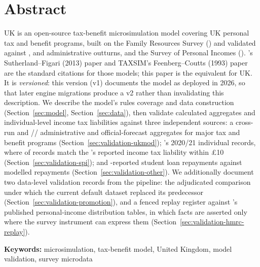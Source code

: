 \section*{Abstract}

\policyengine{} UK is an open-source tax-benefit microsimulation model
covering 
UK personal tax and benefit programs, built on the Family Resources Survey
(\frs{}) and validated against \ukmod{}, \hmrc{} and \dwp{} administrative
outturns, and the Survey of Personal Incomes (\spi{}). \euromod{}'s
Sutherland--Figari (2013) paper and \textsc{TAXSIM}'s Feenberg--Coutts (1993)
paper are the standard citations for those models; this paper is the
equivalent for \policyengine{} UK. It is \emph{versioned}: this version (v1)
documents the model as deployed in 2026, so that later engine migrations
produce a v2 rather than invalidating this description. We describe the
model's rules coverage and data construction (Section~\ref{sec:model},
Section~\ref{sec:data}), then validate calculated aggregates and
individual-level income tax liabilities against three independent sources:
a \ukmod{} cross-run and \hmrc{}/\dwp{}/\obr{} administrative and
official-forecast aggregates for major tax and benefit programs
(Section~\ref{sec:validation-ukmod}); \hmrc{}'s \spi{} 2020/21 individual
records, where  of records match the
\spi{}'s reported income tax liability within \pounds{}10
(Section~\ref{sec:validation-spi}); and \frs{}-reported student loan
repayments against modelled repayments (Section~\ref{sec:validation-other}).
We additionally document two data-level validation records from the
\microcosm{} pipeline: the adjudicated comparison under which the current
default dataset replaced its predecessor
(Section~\ref{sec:validation-promotion}), and a fenced replay register
against \hmrc{}'s published personal-income distribution tables, in which
facts are asserted only where the survey instrument can express them
(Section~\ref{sec:validation-hmrc-replay}).

\vspace{1em}
\noindent\textbf{Keywords:} microsimulation, tax-benefit model, United
Kingdom, model validation, survey microdata
